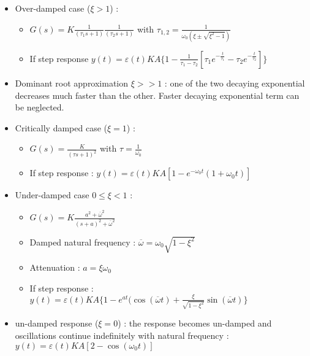 \documentclass[../main.tex]{subfiles}
\begin{document}
\begin{itemize}
    \item Over-damped case ($\xi>1$) :\begin{itemize}
        \item $G(s) = K\frac{1}{(\tau_1 s+1)} \frac{1}{(\tau_2 s+1)}$ with $\tau_{1,2} = \frac{1}{\omega_0(\xi \pm \sqrt{\xi^2-1})}$\\
        \item If step response $y(t) = \varepsilon(t)KA \{1-\frac{1}{\tau_1-\tau_2}[\tau_1 e^{-\frac{t}{\tau_1}}-\tau_2 e^{-\frac{t}{\tau_2}}]\}$\\
    \end{itemize}
    \item Dominant root approximation $\xi>>1$ : one of the two decaying exponential decreases much faster than the other. Faster decaying exponential term can be neglected.\\
    \item Critically damped case ($\xi=1$) : \begin{itemize}
        \item $G(s) = \frac{K}{(\tau s+1)^2}$ with $\tau = \frac{1}{\omega_0}$\\
        \item If step response : $y(t) = \varepsilon(t) KA [1-e^{-\omega_0 t}(1+\omega_0t)]$
    \end{itemize}
    \item Under-damped case $0\leq \xi < 1$ : \begin{itemize}
        \item $G(s) = K\frac{a^2+\overline{\omega}^2}{(s+a)^2+\overline{\omega}^2}$\\
        \item Damped natural frequency : $\overline{\omega} = \omega_0 \sqrt{1-\xi^2}$\\
        \item Attenuation : $a = \xi \omega_0$\\
        \item If step response : $y(t) = \varepsilon(t) KA \{1-e^{at}(\cos{(\overline{\omega}t)}+\frac{\xi}{\sqrt{1-\xi^2}} \sin{(\overline{\omega}t)}\}$
    \end{itemize}
    \item un-damped response ($\xi = 0$) : the response becomes un-damped and oscillations continue indefinitely with natural frequency : $y(t) = \varepsilon(t) KA[2-\cos{(\omega_0 t)}]$\\
\end{itemize}
\end{document}
